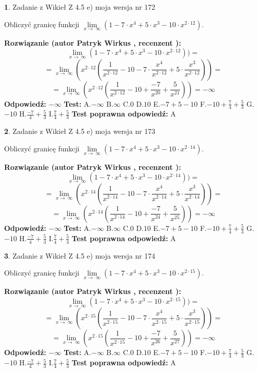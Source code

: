 \documentclass[12pt, a4paper]{article}
\theoremstyle{definition} %
\newtheorem{zad}{}
\newcommand{\zadStart}[1]{\begin{zad}#1\newline}
\newcommand{\zadStop}{\end{zad}}
\newcommand{\rozwStart}[2]{\noindent \textbf{Rozwiązanie (autor #1 , recenzent #2): }\newline}
\newcommand{\rozwStop}{\newline}
\newcommand{\odpStart}{\noindent \textbf{Odpowiedź:}\newline}
\newcommand{\odpStop}{\newline}
\newcommand{\testStart}{\noindent \textbf{Test:}\newline}
\newcommand{\testStop}{\newline}
\newcommand{\kluczStart}{\noindent \textbf{Test poprawna odpowiedź:}\newline}
\newcommand{\kluczStop}{\newline}
\begin{document}
\zadStart{Zadanie z Wikieł Z 4.5 e) moja wersja nr 172}



Obliczyć granicę funkcji  $\lim\limits_{x\to\ \infty}(1 - 7 \cdot x^{4}+5 \cdot x^{3}- 10 \cdot x^{2\cdot12})$.
\zadStop
\rozwStart{Patryk Wirkus}{}
$$\lim\limits_{x\to\ \infty}(1 - 7 \cdot x^{4}+5 \cdot x^{3}- 10 \cdot x^{2\cdot12}))=$$
$$=\lim\limits_{x\to\ \infty}(x^{2\cdot12}(\frac{1}{x^{2\cdot12}}-10 -7 \cdot \frac{x^{4}}{x^{2\cdot12}}+5 \cdot \frac{x^{3}}{x^{2\cdot12}}))=$$
$$=\lim\limits_{x\to\ \infty}(x^{2\cdot12}(\frac{1}{x^{2\cdot12}}-10 + \frac{-7}{x^{20}}+ \frac{5}{x^{21}}))=-\infty$$
\rozwStop
\odpStart
$-\infty$
\odpStop
\testStart
A.$-\infty$ B.$\infty$ C.$0$ D.$10$ E.$-7 + 5 - 10$
F.$-10+\frac{7}{4}+\frac{5}{3}$ G.$-10$
H.$\frac{-7}{4}+\frac{5}{3}$
I.$\frac{7}{4}+\frac{5}{3}$
\testStop
\kluczStart
A
\kluczStop



\zadStart{Zadanie z Wikieł Z 4.5 e) moja wersja nr 173}



Obliczyć granicę funkcji  $\lim\limits_{x\to\ \infty}(1 - 7 \cdot x^{4}+5 \cdot x^{3}- 10 \cdot x^{2\cdot14})$.
\zadStop
\rozwStart{Patryk Wirkus}{}
$$\lim\limits_{x\to\ \infty}(1 - 7 \cdot x^{4}+5 \cdot x^{3}- 10 \cdot x^{2\cdot14}))=$$
$$=\lim\limits_{x\to\ \infty}(x^{2\cdot14}(\frac{1}{x^{2\cdot14}}-10 -7 \cdot \frac{x^{4}}{x^{2\cdot14}}+5 \cdot \frac{x^{3}}{x^{2\cdot14}}))=$$
$$=\lim\limits_{x\to\ \infty}(x^{2\cdot14}(\frac{1}{x^{2\cdot14}}-10 + \frac{-7}{x^{24}}+ \frac{5}{x^{25}}))=-\infty$$
\rozwStop
\odpStart
$-\infty$
\odpStop
\testStart
A.$-\infty$ B.$\infty$ C.$0$ D.$10$ E.$-7 + 5 - 10$
F.$-10+\frac{7}{4}+\frac{5}{3}$ G.$-10$
H.$\frac{-7}{4}+\frac{5}{3}$
I.$\frac{7}{4}+\frac{5}{3}$
\testStop
\kluczStart
A
\kluczStop



\zadStart{Zadanie z Wikieł Z 4.5 e) moja wersja nr 174}



Obliczyć granicę funkcji  $\lim\limits_{x\to\ \infty}(1 - 7 \cdot x^{4}+5 \cdot x^{3}- 10 \cdot x^{2\cdot15})$.
\zadStop
\rozwStart{Patryk Wirkus}{}
$$\lim\limits_{x\to\ \infty}(1 - 7 \cdot x^{4}+5 \cdot x^{3}- 10 \cdot x^{2\cdot15}))=$$
$$=\lim\limits_{x\to\ \infty}(x^{2\cdot15}(\frac{1}{x^{2\cdot15}}-10 -7 \cdot \frac{x^{4}}{x^{2\cdot15}}+5 \cdot \frac{x^{3}}{x^{2\cdot15}}))=$$
$$=\lim\limits_{x\to\ \infty}(x^{2\cdot15}(\frac{1}{x^{2\cdot15}}-10 + \frac{-7}{x^{26}}+ \frac{5}{x^{27}}))=-\infty$$
\rozwStop
\odpStart
$-\infty$
\odpStop
\testStart
A.$-\infty$ B.$\infty$ C.$0$ D.$10$ E.$-7 + 5 - 10$
F.$-10+\frac{7}{4}+\frac{5}{3}$ G.$-10$
H.$\frac{-7}{4}+\frac{5}{3}$
I.$\frac{7}{4}+\frac{5}{3}$
\testStop
\kluczStart
A
\kluczStop
\end{document}
